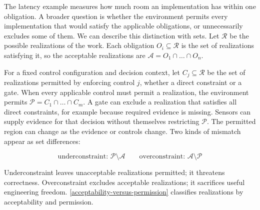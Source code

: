 The latency example measures how much room an implementation has within one obligation. A broader question is whether the environment permits every implementation that would satisfy the applicable obligations, or unnecessarily excludes some of them. We can describe this distinction with sets. Let \(\mathcal R\) be the possible realizations of the work. Each obligation \(O_i \subseteq \mathcal R\) is the set of realizations satisfying it, so the acceptable realizations are \(\mathcal A = O_1 \cap \ldots \cap O_n\).

For a fixed control configuration and decision context, let \(C_j \subseteq \mathcal R\) be the set of realizations permitted by enforcing control \(j\), whether a direct constraint or a gate. When every applicable control must permit a realization, the environment permits \(\mathcal P = C_1 \cap \ldots \cap C_m\). A gate can exclude a realization that satisfies all direct constraints, for example because required evidence is missing. Sensors can supply evidence for that decision without themselves restricting \(\mathcal P\). The permitted region can change as the evidence or controls change. Two kinds of mismatch appear as set differences:

\[
\text{underconstraint: } \mathcal P \setminus \mathcal A \qquad \text{overconstraint: } \mathcal A \setminus \mathcal P
\]

Underconstraint leaves unacceptable realizations permitted; it threatens correctness. Overconstraint excludes acceptable realizations; it sacrifices useful engineering freedom. \autoref{acceptability-versus-permission} classifies realizations by acceptability and permission.

